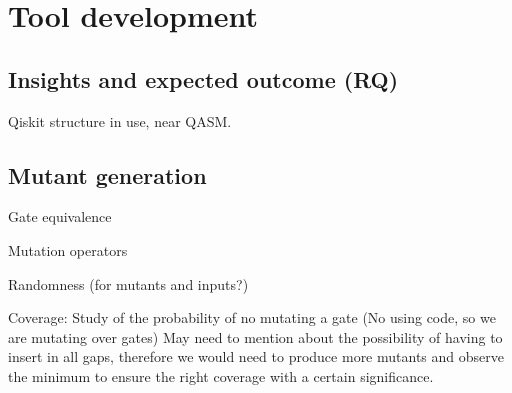 \section{Tool development}

\subsection{Insights and expected outcome (RQ)}

Qiskit structure in use, near QASM.

\subsection{Mutant generation}

Gate equivalence\newline

Mutation operators\newline

Randomness (for mutants and inputs?)\newline

Coverage: Study of the probability of no mutating a gate (No using code, so we are mutating over gates)
        May need to mention about the possibility of having to insert in all gaps, therefore we would need to produce more mutants and observe the minimum to ensure the right coverage with a certain significance.
